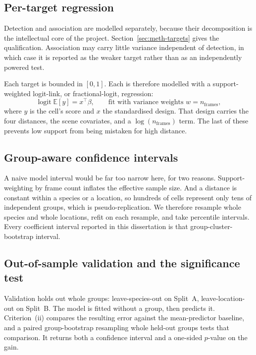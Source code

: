 \subsection{Per-target regression}
\label{sec:meth-per-target}
Detection and association are modelled separately, because their decomposition is the intellectual core of the
project. Section~\ref{sec:meth-targets} gives the qualification. Association may carry little variance
independent of detection, in which case it is reported as the weaker target rather than as an independently
powered test.

Each target is bounded in $[0,1]$. Each is therefore modelled with a support-weighted logit-link, or
fractional-logit, regression:
\begin{equation}
  \operatorname{logit}\mathbb{E}[y]=x^{\!\top}\beta,
  \qquad\text{fit with variance weights } w=n_{\mathrm{frames}},
  \label{eq:glm}
\end{equation}
where $y$ is the cell's score and $x$ the standardised design. That design carries the four distances, the
scene covariates, and a $\log(n_\text{frames})$ term. The last of these prevents low support from being
mistaken for high distance.

\subsection{Group-aware confidence intervals}
\label{sec:meth-inference}
A naive model interval would be far too narrow here, for two reasons. Support-weighting by frame count inflates
the effective sample size. And a distance is constant within a species or a location, so hundreds of cells
represent only tens of independent groups, which is pseudo-replication. We therefore resample whole species and
whole locations, refit on each resample, and take percentile intervals. Every coefficient interval reported in
this dissertation is that group-cluster-bootstrap interval.

\subsection{Out-of-sample validation and the significance test}
\label{sec:meth-cv}
Validation holds out whole groups: leave-species-out on Split~A, leave-location-out on Split~B. The model is
fitted without a group, then predicts it. Criterion~(ii) compares the resulting error against the
mean-predictor baseline, and a paired group-bootstrap resampling whole held-out groups tests that comparison.
It returns both a confidence interval and a one-sided $p$-value on the gain.

